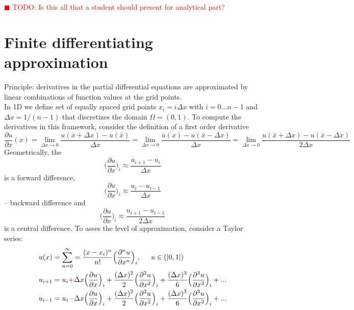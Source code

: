 \documentclass{article}
\newcommand{\todo}[1]{\textcolor{red}{$\blacksquare$ TODO: #1}}
\begin{document}
\todo{Is this all that a student should present for analytical part?}

\section{Finite differentiating approximation}
\label{sec:findiffapp}
Principle: derivatives in the partial differential equations are approximated by linear combinations of function values at the grid points. \\
In 1D we define set of equally spaced grid points $x_i = i\Delta x$ with $i = 0 ... n-1$ and $\Delta x = 1 / (n-1)$ that discretizes the domain $\Omega = (0, 1)$. To compute the derivatives in this framework, consider the definition of a first order derivative
\begin{equation}
	\frac{\partial u}{\partial x}(x) = \lim\limits_{\Delta x \rightarrow 0}\frac{u(\bar{x}+\Delta x) - u(\bar{x})}{\Delta x} = \lim\limits_{\Delta x \rightarrow 0} \frac{\bar{u}(x) - u(\bar{x} - \Delta x)}{\Delta x} = \lim\limits_{\Delta x \rightarrow 0}\frac{u(\bar{x} + \Delta x) - u(\bar{x} - \Delta x)}{2\Delta x}
\end{equation}
Geometrically, the 
\begin{equation}
	\Big(\frac{\partial u}{\partial x}\Big)_i \approx \frac{u_{i+1} - u_i}{\Delta x}
\end{equation}
is a forward difference,
\begin{equation}
\Big(\frac{\partial u}{\partial x}\Big)_i \approx \frac{u_i - u_{i-1}}{\Delta x}
\end{equation}
-- backward difference and
\begin{equation}
\Big(\frac{\partial u}{\partial x}\Big)_i \approx \frac{u_{i+1} - u_{i-1}}{2\Delta x}
\end{equation}
is a central difference.
To asses the level of approximation, consider a Taylor series:
\begin{equation}
	\begin{aligned}
	u(x) &= \sum\limits_{n=0}^{\infty} = \frac{(x-x_i)^n}{n!}\Big(\frac{\partial^n u}{\partial x^n}\Big)_i, \hspace{5mm} u\in(|0,1|) \\
	u_{i+1} &= u_i \textcolor{red}{+} \Delta x\Big(\frac{\partial u}{\partial x}\Big)_i + \frac{(\Delta x)^2}{2}\Big(\frac{\partial^2 u}{\partial x^2}\Big)_i + \frac{(\Delta x)^3}{6}\Big(\frac{\partial^3 u}{\partial x^3}\Big)_i + ... \\
	u_{i-1} &= u_i \textcolor{red}{-} \Delta x\Big(\frac{\partial u}{\partial x}\Big)_i + \frac{(\Delta x)^2}{2}\Big(\frac{\partial^2 u}{\partial x^2}\Big)_i + \frac{(\Delta x)^3}{6}\Big(\frac{\partial^3 u}{\partial x^3}\Big)_i + ... 
	\end{aligned}
\end{equation}
\end{document}
